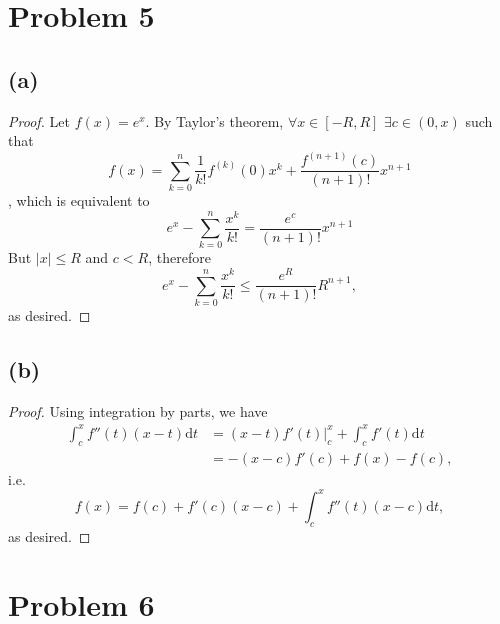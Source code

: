 \documentclass{article}
\begin{document}
\section*{Problem 5}
\subsection*{(a)}
\begin{proof}
	Let $f(x) = e^x$. By Taylor's theorem, $\forall x \in [-R, R]$ $\exists c \in (0, x)$ such that
	\begin{equation}
		f(x) = \sum_{k=0}^n \frac{1}{k!}f^{(k)}(0)x^k + \frac{f^{(n+1)}(c)}{(n+1)!}x^{n+1}
	\end{equation},
	which is equivalent to
	\begin{equation}
		e^x - \sum_{k=0}^n \frac{x^k}{k!} = \frac{e^c}{(n+1)!}x^{n+1}
	\end{equation}
	But $|x| \leq R$ and $c < R$, therefore
	\begin{equation}
		e^x - \sum_{k=0}^n \frac{x^k}{k!} \leq \frac{e^R}{(n+1)!}R^{n+1},
	\end{equation}
	as desired.
\end{proof}

\subsection*{(b)}
\begin{proof}
	Using integration by parts, we have
	\begin{align}
		\int_c ^x f''(t) (x - t) \mathrm{d}t &= (x - t) f'(t) \big|_c ^x + \int_c ^x f'(t) \mathrm{d}t \\
		&= -(x - c) f'(c) + f(x) - f(c),
	\end{align}
	i.e. 
	\begin{equation}
		f(x) = f(c) + f'(c) (x - c) + \int_c ^x f''(t) (x - c) \mathrm{d}t,
	\end{equation}
	as desired.
\end{proof}
\section*{Problem 6}
\end{document}
